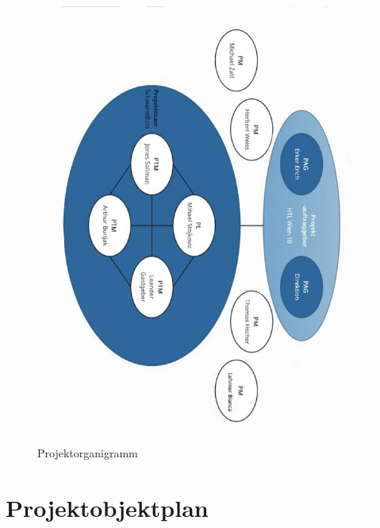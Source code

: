 \begin{figure}[H]
    \centering
    \includegraphics[width=\textwidth]{img/Projektorganigramm.jpeg}
    \caption{Projektorganigramm}
    \label{fig:organigramm}
\end{figure}


\newpage

\section{Projektobjektplan}

